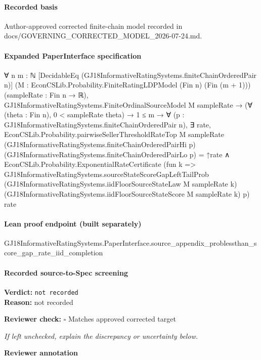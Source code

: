 \documentclass[10pt]{article}
\newcommand{\reviewerbox}{%
  \par\noindent\fbox{\parbox{0.96\linewidth}{\rule{0pt}{0.38in}}}\par
}
\newcommand{\reviewmatch}[1]{%
  \par\noindent\textbf{Reviewer check:} $\square$\; #1\par
  \noindent\emph{If left unchecked, explain the discrepancy or uncertainty below.}\par
}
\begin{document}
\paragraph{Recorded basis}
Author-\allowbreak{}approved corrected finite-\allowbreak{}chain model recorded in docs/\allowbreak{}GOVERNING\_\allowbreak{}CORRECTED\_\allowbreak{}MODEL\_\allowbreak{}2026-\allowbreak{}07-\allowbreak{}24.\allowbreak{}md.\allowbreak{}
\paragraph{Expanded PaperInterface specification}
\begin{ReviewVerbatim}
∀ {n m : ℕ} [DecidableEq (GJ18InformativeRatingSystems.finiteChainOrderedPair n)]
  (M : EconCSLib.Probability.FiniteRatingLDPModel (Fin n) (Fin (m + 1))) (sampleRate : Fin n → ℝ),
  GJ18InformativeRatingSystems.FiniteOrdinalSourceModel M sampleRate →
    (∀ (theta : Fin n), 0 < sampleRate theta) →
      1 ≤ m →
        ∀ (p : GJ18InformativeRatingSystems.finiteChainOrderedPair n),
          ∃ rate,
            EconCSLib.Probability.pairwiseSellerThresholdRateTop M sampleRate
                  (GJ18InformativeRatingSystems.finiteChainOrderedPairHi p)
                  (GJ18InformativeRatingSystems.finiteChainOrderedPairLo p) =
                ↑rate ∧
              EconCSLib.Probability.ExponentialRateCertificate
                (fun k =>
                  GJ18InformativeRatingSystems.sourceStateScoreGapLeftTailProb
                    (GJ18InformativeRatingSystems.iidFloorSourceStateLaw M sampleRate k)
                    (GJ18InformativeRatingSystems.iidFloorSourceStateScore M sampleRate k) p)
                rate
\end{ReviewVerbatim}

\paragraph{Lean proof endpoint (built separately)}\begin{ReviewVerbatim}
GJ18InformativeRatingSystems.PaperInterface.source_appendix_problessthan_score_gap_rate_iid_completion
\end{ReviewVerbatim}

\paragraph{Recorded source-to-Spec screening}
\textbf{Verdict:} \texttt{not recorded}
\\
\textbf{Reason:} not recorded
\reviewmatch{Matches approved corrected target}
\noindent\textbf{Reviewer annotation}\par
\reviewerbox
\clearpage
\hypertarget{source-claim-1d1f73c1a511cd77}{}
\end{document}
